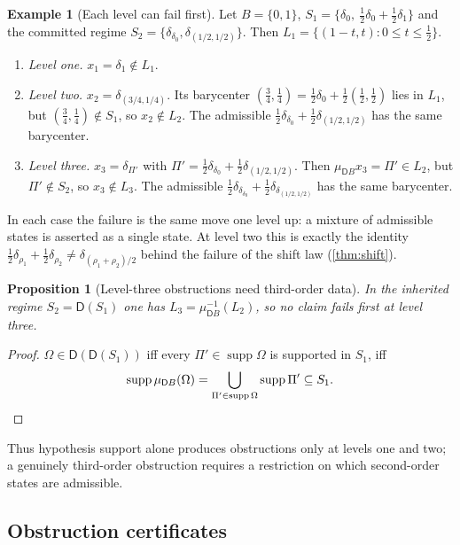 \documentclass[11pt]{article}
\newtheorem{proposition}[theorem]{Proposition}
\theoremstyle{definition}
\newtheorem{example}[theorem]{Example}
\theoremstyle{remark}
\newcommand{\D}{\mathsf{D}}
\begin{document}
\begin{example}[Each level can fail first]\label{ex:failures}
Let $B=\{0,1\}$, $S_1=\{\delta_0,\ \tfrac12\delta_0+\tfrac12\delta_1\}$ and the committed regime
$S_2=\{\delta_{\delta_0},\delta_{(1/2,1/2)}\}$. Then $L_1=\{(1-t,t):0\le t\le\tfrac12\}$.
\begin{enumerate}[label=(\alph*)]
\item \emph{Level one.} $x_1=\delta_1\notin L_1$.
\item \emph{Level two.} $x_2=\delta_{(3/4,1/4)}$. Its barycenter $(\tfrac34,\tfrac14)=\tfrac12\delta_0+
  \tfrac12(\tfrac12,\tfrac12)$ lies in $L_1$, but $(\tfrac34,\tfrac14)\notin S_1$, so $x_2\notin L_2$.
  The admissible $\tfrac12\delta_{\delta_0}+\tfrac12\delta_{(1/2,1/2)}$ has the same barycenter.
\item \emph{Level three.} $x_3=\delta_{\Pi'}$ with $\Pi'=\tfrac12\delta_{\delta_0}+
  \tfrac12\delta_{(1/2,1/2)}$. Then $\mu_{\D B}x_3=\Pi'\in L_2$, but $\Pi'\notin S_2$, so $x_3\notin L_3$.
  The admissible $\tfrac12\delta_{\delta_{\delta_0}}+\tfrac12\delta_{\delta_{(1/2,1/2)}}$ has the same
  barycenter.
\end{enumerate}
In each case the failure is the same move one level up: a mixture of admissible states is asserted as
a single state. At level two this is exactly the identity
$\tfrac12\delta_{\rho_1}+\tfrac12\delta_{\rho_2}\neq\delta_{(\rho_1+\rho_2)/2}$ behind the failure of the
shift law (\cref{thm:shift}).
\end{example}

\begin{proposition}[Level-three obstructions need third-order data]\label{prop:inherited}
In the inherited regime $S_2=\D(S_1)$ one has $L_3=\mu_{\D B}^{-1}(L_2)$, so no claim fails first at
level three.
\end{proposition}
\begin{proof}
$\Omega\in\D(\D(S_1))$ iff every $\Pi'\in\operatorname{supp}\Omega$ is supported in $S_1$, iff
\[
\operatorname{supp}\mu_{\D B}(\Omega)=\bigcup_{\Pi'\in\operatorname{supp}\Omega}\operatorname{supp}\Pi'
\subseteq S_1. \qedhere
\]
\end{proof}

Thus hypothesis support alone produces obstructions only at levels one and two; a genuinely
third-order obstruction requires a restriction on which second-order states are admissible.

\subsection{Obstruction certificates}
\end{document}
